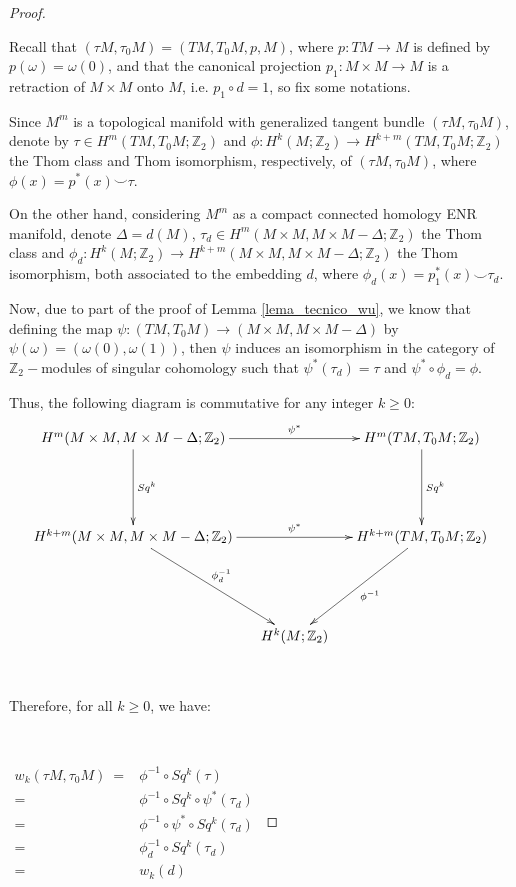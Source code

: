 \documentclass[12pt,oneside]{book}
\newcommand{\Z}{\mathbb{Z}}
\newcommand{\ccup}{\smile}
\begin{document}
    \begin{proof}
    
    	\
    
    	Recall that $(\tau M,\tau_{0}M)=(TM,T_{0}M,p,M)$, where $p:TM\to M$ is defined by $p(\omega)=\omega(0)$, and that the canonical 
        projection $p_{1}:M\times M\to M$ is a retraction of $M\times M$ onto $M$, i.e. $p_{1}\circ d=1$, so fix some 
        notations.
    
    	Since $M^{m}$ is a topological manifold with generalized tangent bundle $(\tau M,\tau_{0}M)$, denote by 
        $\tau\in H^{m}(TM,T_{0}M;\Z_{2})$ and $\phi:H^{k}(M;\Z_{2})\to H^{k+m}(TM,T_{0}M;\Z_{2})$ the Thom class and Thom isomorphism, 
        respectively, of $(\tau M,\tau_{0}M)$, where $\phi(x)=p^{*}(x)\ccup \tau$.
    
    	On the other hand, considering $M^{m}$ as a compact connected homology ENR manifold, denote 
        $\Delta=d(M)$, $\tau_{d}\in H^{m}(M\times M,M\times M-\Delta;\Z_{2})$ the Thom class and 
        $\phi_{d}:H^{k}(M;\Z_{2})\to H^{k+m}(M\times M,M\times M-\Delta;\Z_{2})$ the Thom isomorphism, both associated 
        to the embedding $d$, where $\phi_{d}(x)=p_{1}^{*}(x)\ccup\tau_{d}$.
    
    	Now, due to part of the proof of Lemma \ref{lema_tecnico_wu}, we know that defining the map 
        $\psi:(TM,T_{0}M)\to (M\times M,M\times M-\Delta)$ by $\psi(\omega)=(\omega(0),\omega(1))$, then $\psi$ induces an isomorphism in the 
        category of $\Z_{2}-$modules of singular cohomology such that $\psi^{*}(\tau_{d})=\tau$ and $\psi^{*}\circ \phi_{d}=\phi$.
    
    	Thus, the following diagram is commutative for any integer $k\geq 0$:
    	$$ \xymatrix @C=0.5cm {
            H^{m}(M\times M,M\times M-\Delta;\Z_{2}) \ar[dd]^-{Sq^{k}} \ar[rr]^-{\psi^{*}} & & H^{m}(TM,T_{0}M;\Z_{2}) \ar[dd]^-{Sq^{k}} \\
             & & \\
            H^{k+m}(M\times M,M\times M-\Delta;\Z_{2}) \ar[rdd]^-{\phi_{d}^{-1}} \ar[rr]^-{\psi^{*}} & & H^{k+m}(TM,T_{0}M;\Z_{2}) \ar[ldd]^-{\phi^{-1}} \\
             & & \\
             & H^{k}(M;\Z_{2}) &
        } $$

        \
        
        Therefore, for all $k\geq 0$, we have:

        \
    
    	$ \begin{array}{rl}
    		w_{k}(\tau M,\tau_{0}M) \ = & \phi^{-1}\circ Sq^{k}(\tau) \\
    		= & \phi^{-1}\circ Sq^{k}\circ \psi^{*}(\tau_{d}) \\
    		= & \phi^{-1}\circ \psi^{*}\circ Sq^{k}(\tau_{d}) \\
    		= & \phi_{d}^{-1}\circ Sq^{k}(\tau_{d}) \\
    		= & w_{k}(d)
    	\end{array} $
    
    \end{proof}
   
\end{document}
